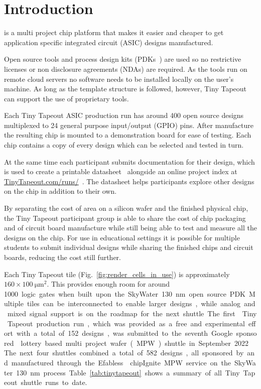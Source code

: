 \section{Introduction}
\label{sec:introduction}
 is a multi project chip platform that makes it easier and cheaper to get application specific integrated circuit (ASIC) designs manufactured.

Open source tools and process design kits (PDKs~\cite{pdk}) are used so no restrictive licenses or non disclosure agreements (NDAs) are required. As the tools run on remote cloud servers no software needs to be installed locally on the user's machine. As long as the template structure is followed, however, Tiny Tapeout can support the use of proprietary tools.

Each Tiny Tapeout ASIC production run has around 400 open source designs multiplexed to 24 general purpose input/output (GPIO) pins. After manufacture the resulting chip is mounted to a demonstration board for ease of testing. Each chip contains a copy of every design which can be selected and tested in turn.

At the same time each participant submits documentation for their design, which is used to create a printable datasheet~\cite{datasheet} alongside an online project index at \url{TinyTapeout.com/runs/}~\cite{tinytapeoutruns}. The datasheet helps participants explore other designs on the chip in addition to their own.

By separating the cost of area on a silicon wafer and the finished physical chip, the Tiny Tapeout participant group is able to share the cost of chip packaging and of circuit board manufacture while still being able to test and measure all the designs on the chip. For use in educational settings it is possible for multiple students to submit individual designs while sharing the finished chips and circuit boards, reducing the cost still further.

Each Tiny Tapeout tile (Fig.~\ref{fig:render_cells_in_use}) is approximately $\qty{160} \times \qty{100}{\micro\meter\squared}$. This provides enough room for around \qty{1000} logic gates when built upon the SkyWater \qty{130}{\nm} open source PDK. Multiple tiles can be interconnected to enable larger designs, while analog and mixed signal support is on the roadmap for the next shuttle.

The first~\cite{firstshuttle} Tiny Tapeout production run, which was provided as a free and experimental effort with a total of \qty{152} designs, was submitted to the seventh Google sponsored~\cite{googlesponsored} lottery based multi project wafer (MPW) shuttle in September 2022.
The next four shuttles combined a total of \qty{582} designs, all sponsored by and manufactured through the Efabless~\cite{efabless} chipIgnite MPW service on the SkyWater \qty{130}{\nm} process. Table~\ref{tab:tinytapeout} shows a summary of all Tiny Tapeout shuttle runs to date.

